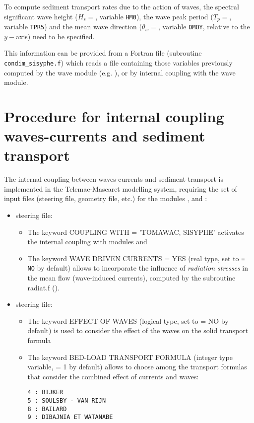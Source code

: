  To compute sediment transport rates due to the action of waves, the spectral significant wave height ($H_s =$, variable \texttt{HM0}), the wave peak period ($T_p =$, variable \texttt{TPR5}) and the mean wave direction ($\theta_w =$, variable \texttt{DMOY}, relative to the $y-$axis) need to be specified.

 This information can be provided from a Fortran file (subroutine \texttt{condim\_sisyphe.f}) which reads a file containing those variables previously computed by the wave module (e.g. \tomawac{}), or by internal coupling with the wave module.
 
\section{Procedure for internal coupling waves-currents and sediment transport}
The internal coupling between waves-currents and sediment transport is implemented in the Telemac-Mascaret modelling system, requiring the set of input files (steering file, geometry file, etc.) for the modules , \tomawac{} and \sisyphe{}:
\begin{itemize}
  \item {} steering file:
\begin{itemize}
\item The keyword {\ttfamily COUPLING WITH = 'TOMAWAC, SISYPHE'} activates the internal coupling with modules \tomawac{} and \sisyphe{}
\item The keyword {\ttfamily WAVE DRIVEN CURRENTS = YES} (real type, set to \texttt{= NO} by default) allows to incorporate the influence of \textit{radiation stresses} in the mean flow (wave-induced currents), computed by the subroutine {\ttfamily radiat.f} (\tomawac{}).
\end{itemize}

 \item \sisyphe{} steering file:
\begin{itemize}
\item The keyword {\ttfamily EFFECT OF WAVES} (logical type, set to {\ttfamily = NO} by default) is used to consider the effect of the waves on the solid transport formula
\item The keyword {\ttfamily BED-LOAD TRANSPORT FORMULA} (integer type variable, {\ttfamily = 1} by default) allows to choose among the transport formulas that consider the combined effect of currents and waves:
\begin{lstlisting}[frame=trBL]    
4 : BIJKER 
5 : SOULSBY - VAN RIJN 
8 : BAILARD 
9 : DIBAJNIA ET WATANABE
\end{lstlisting}
\end{itemize}
\end{itemize}

